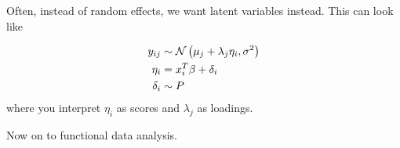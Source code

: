 \documentclass{article}
\begin{document}
Often, instead of random effects, we want latent variables instead. This can
look like

\begin{align}
  y_{ij} &\sim \mathcal{N}\left(\mu_{j} + \lambda_{j} \eta_{i}, \sigma^{2}\right) \\
  \eta_{i} &= x_{i}^{T}\beta + \delta_{i} \\
  \delta_{i} &\sim P
\end{align}
where you interpret $\eta_{i}$ as scores and $\lambda_{j}$ as loadings.

Now on to functional data analysis.
\end{document}
